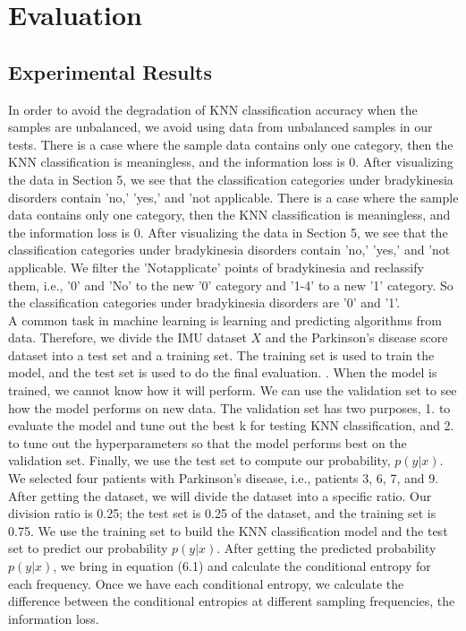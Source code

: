 \chapter{Evaluation}

\section{Experimental Results}
In order to avoid the degradation of KNN classification accuracy when the samples are unbalanced, we avoid using data from unbalanced samples in our tests. There is a case where the sample data contains only one category, then the KNN classification is meaningless, and the information loss is 0. After visualizing the data in Section 5, we see that the classification categories under bradykinesia disorders contain 'no,' 'yes,' and 'not applicable. There is a case where the sample data contains only one category, then the KNN classification is meaningless, and the information loss is 0. After visualizing the data in Section 5, we see that the classification categories under bradykinesia disorders contain 'no,' 'yes,' and 'not applicable. We filter the 'Notapplicate' points of bradykinesia and reclassify them, i.e., '0' and 'No' to the new '0' category and '1-4' to a new '1' category. So the classification categories under bradykinesia disorders are '0' and '1'. \\

A common task in machine learning is learning and predicting algorithms from data. \cite{RN3} Therefore, we divide the IMU dataset $X$ and the Parkinson's disease score dataset into a test set and a training set. The training set is used to train the model, and the test set is used to do the final evaluation. \cite{hastie2009elements}. When the model is trained, we cannot know how it will perform. We can use the validation set to see how the model performs on new data. The validation set has two purposes, 1. to evaluate the model and tune out the best k for testing KNN classification, and 2. to tune out the hyperparameters so that the model performs best on the validation set. Finally, we use the test set to compute our probability, $p(y|x)$. \cite{RN4} \\

We selected four patients with Parkinson's disease, i.e., patients 3, 6, 7, and 9. After getting the dataset, we will divide the dataset into a specific ratio. Our division ratio is 0.25; the test set is 0.25 of the dataset, and the training set is 0.75. We use the training set to build the KNN classification model and the test set to predict our probability $p(y|x)$. After getting the predicted probability $p(y|x)$, we bring in equation (6.1) and calculate the conditional entropy for each frequency. Once we have each conditional entropy, we calculate the difference between the conditional entropies at different sampling frequencies, the information loss. \\

